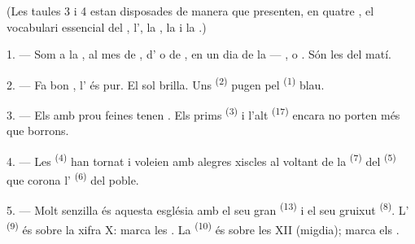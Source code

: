 
\VUsaut{3.0mm}
\VUsaut{1.6mm}
\VUsaut{3.4mm}

(Les taules 3 i 4 estan disposades de manera que presenten, en quatre
, el vocabulari essencial del , l',
la , la  i la .)
\VUsaut{4.0mm}

\VUsaut{3.0mm}

\VUsaut{2.4mm}

\VUsaut{3.0mm}

1. --- Som a la , al mes de , d' o de
, en un dia de la  --- ,
 o . Són les  del matí.

2. --- Fa bon , l' és pur. El sol brilla. Uns
 \textsuperscript{(2)} pugen pel 
\textsuperscript{(1)} blau.

3. --- Els  amb prou feines tenen . Els prims
 \textsuperscript{(3)} i l'alt 
\textsuperscript{(17)} encara no porten més que borrons.

4. --- Les  \textsuperscript{(4)} han tornat i voleien amb alegres xiscles al
voltant de la  \textsuperscript{(7)} del
 \textsuperscript{(5)} que corona l'
\textsuperscript{(6)} del poble.

\VUsaut{3.4mm}
\VUsaut{3.0mm}

5. --- Molt senzilla és aquesta església amb el seu gran 
\textsuperscript{(13)} i el seu gruixut  \textsuperscript{(8)}.
L' \textsuperscript{(9)} és sobre la xifra X: marca les
. La  \textsuperscript{(10)} és sobre les XII
(migdia); marca els .

